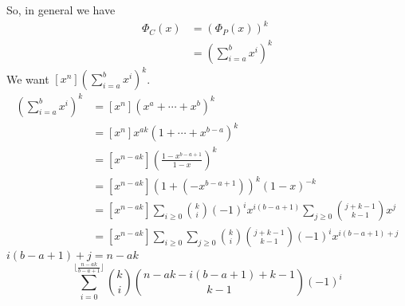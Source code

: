So, in general we have
\begin{align*}
    \Phi_C(x) & =\left(\Phi_P(x)\right)^k                   \\
              & =\left( \sum\limits_{i=a}^{b} x^i \right)^k
\end{align*}
We want $ \left[x^n\right]\left( \sum\limits_{i=a}^{b} x^i \right)^k $.
\begin{align*}
    [x^n]\left( \sum\limits_{i=a}^{b} x^i \right)^k
     & =\left[x^n\right](x^a+\cdots+x^b)^k                                                                               \\
     & =\left[x^n\right]x^{ak}(1+\cdots+x^{b-a})^k                                                                       \\
     & =\left[x^{n-ak}\right]\left(\frac{1-x^{b-a+1}}{1-x}\right)^k                                                      \\
     & =\left[x^{n-ak}\right]\left(1+(-x^{b-a+1})\right)^k(1-x)^{-k}                                                     \\
     & =\left[x^{n-ak}\right]\sum\limits_{i\ge 0}\binom{k}{i}(-1)^i x^{i(b-a+1)}
    \sum\limits_{j\ge 0}\binom{j+k-1}{k-1}x^{j}                                                                          \\
     & =\left[x^{n-ak}\right]\sum\limits_{i\ge 0}\sum\limits_{j\ge 0}\binom{k}{i}\binom{j+k-1}{k-1}(-1)^i x^{i(b-a+1)+j}
\end{align*}
$ i(b-a+1)+j=n-ak $
\[ \sum\limits_{i=0}^{\lfloor \frac{n-ak}{b-a+1} \rfloor}
    \binom{k}{i}\binom{n-ak-i(b-a+1)+k-1}{k-1}(-1)^i \]
